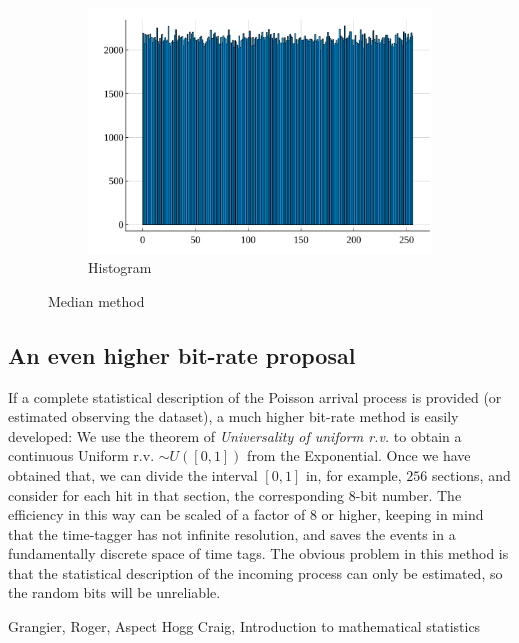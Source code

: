\documentclass[10pt, final]{article}
\begin{document}
\begin{multicols}{2}
\begin{mdframed}
\begin{figure}[H]
        \begin{subfigure}{\textwidth}
            \centering
            \includegraphics[width = \textwidth]{../random_img/naif-histogram.pdf}
            \caption{Histogram}
        \end{subfigure}
        \caption{Median method}
        \label{median}
    \end{figure}
\end{mdframed}


\subsection*{An even higher bit-rate proposal}
If a complete statistical description of the Poisson arrival process is provided (or estimated observing the dataset), a much higher bit-rate method is easily developed:
We use the theorem of \emph{Universality of uniform r.v.} to obtain a continuous Uniform r.v. $\sim U([0, 1])$ from the Exponential. Once we have obtained that, we can divide the interval $[0, 1]$ in, for example, $256$ sections, and consider for each hit in that section, the corresponding $8$-bit number. The efficiency in this way can be scaled of a factor of $8$ or higher, keeping in mind that the time-tagger has not infinite resolution, and saves the events in a fundamentally discrete space of time tags.
The obvious problem in this method is that the statistical description of the incoming process can only be estimated, so the random bits will be unreliable.



\begin{thebibliography}{99}
   Grangier, Roger, Aspect
   Hogg Craig, Introduction to mathematical statistics
\end{thebibliography}
\end{multicols}
\end{document}
